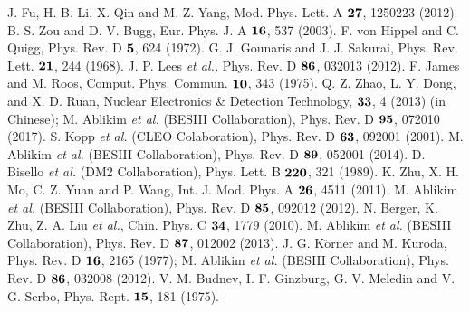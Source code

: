 \documentclass[twocolumn,showpacs,aps,prd]{revtex4-1}
\begin{document}
\begin{thebibliography}{**}
   J. Fu, H. B. Li, X. Qin and M. Z. Yang, Mod. Phys. Lett. A $\bf{27}$, 1250223 (2012).
   B. S. Zou and D. V. Bugg, Eur. Phys. J. A $\bf{16}$, 537 (2003).
  F. von Hippel and C. Quigg, Phys. Rev. D $\bf 5$, 624 (1972).
  G. J. Gounaris and J. J. Sakurai, Phys. Rev. Lett. $\bf 21$, 244 (1968).
  J. P. Lees {\it et al.,} Phys. Rev. D $\bf 86$, 032013 (2012).
   F. James and M. Roos, Comput. Phys. Commun. $\bf{10}$, 343 (1975).
   Q. Z. Zhao, L. Y. Dong, and X. D. Ruan, Nuclear Electronics $\&$ Detection Technology, $\bf{33}$, 4 (2013) (in Chinese); M. Ablikim {\it et al.} (BESIII Collaboration), Phys. Rev. D $\bf{95}$, 072010 (2017).
   S. Kopp {\it et al.} (CLEO Colaboration), Phys. Rev. D $\bf{63}$, 092001 (2001).
   M. Ablikim {\it et al.} (BESIII Collaboration), Phys. Rev. D $\bf{89}$, 052001 (2014).
   D. Bisello {\it et al.} (DM2 Collaboration), Phys. Lett. B $\bf{220}$, 321 (1989).
   K. Zhu, X. H. Mo, C. Z. Yuan and P. Wang, Int. J. Mod. Phys. A $\bf{26}$, 4511 (2011).
   M. Ablikim {\it et al.} (BESIII Collaboration), Phys. Rev. D $\bf{85}$, 092012 (2012).
   N. Berger, K. Zhu, Z. A. Liu {\it et al.}, Chin. Phys. C $\bf{34}$, 1779 (2010).
   M. Ablikim {\it et al.} (BESIII Collaboration), Phys. Rev. D $\bf{87}$, 012002 (2013).
   J. G. K$\mathrm{\ddot{o}}$rner and M. Kuroda, Phys. Rev. D $\bf{16}$, 2165 (1977); M. Ablikim {\it et al.} (BESIII Collaboration), Phys. Rev. D $\bf{86}$, 032008 (2012).
   V. M. Budnev, I. F. Ginzburg, G. V. Meledin and V. G. Serbo, Phys. Rept. $\bf{15}$, 181 (1975).
\end{thebibliography}
\end{document}
